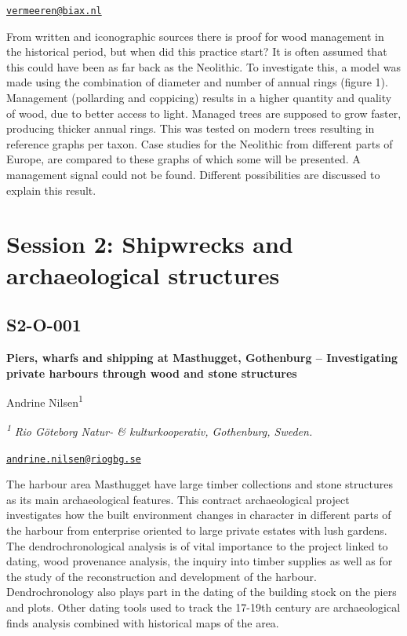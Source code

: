 \documentclass[
]{book}
\begin{document}
\href{mailto:vermeeren@biax.nl}{\nolinkurl{vermeeren@biax.nl}}

From written and iconographic sources there is proof for wood management in the historical period, but when did this practice start? It is often assumed that this could have been as far back as the Neolithic. To investigate this, a model was made using the combination of diameter and number of annual rings (figure 1). Management (pollarding and coppicing) results in a higher quantity and quality of wood, due to better access to light. Managed trees are supposed to grow faster, producing thicker annual rings. This was tested on modern trees resulting in reference graphs per taxon. Case studies for the Neolithic from different parts of Europe, are compared to these graphs of which some will be presented. A management signal could not be found. Different possibilities are discussed to explain this result.

\hypertarget{session-2-shipwrecks-and-archaeological-structures}{%
\chapter*{Session 2: Shipwrecks and archaeological structures}\label{session-2-shipwrecks-and-archaeological-structures}}

\hypertarget{s2-o-001}{%
\section*{S2-O-001}\label{s2-o-001}}

\textbf{Piers, wharfs and shipping at Masthugget, Gothenburg -- Investigating private harbours through wood and stone structures}

Andrine Nilsen\textsuperscript{1}

\textsuperscript{\emph{1}} \emph{Rio Göteborg Natur- \& kulturkooperativ, Gothenburg, Sweden.}

\href{mailto:andrine.nilsen@riogbg.se}{\nolinkurl{andrine.nilsen@riogbg.se}}

The harbour area Masthugget have large timber collections and stone structures as its main archaeological features. This contract archaeological project investigates how the built environment changes in character in different parts of the harbour from enterprise oriented to large private estates with lush gardens. The dendrochronological analysis is of vital importance to the project linked to dating, wood provenance analysis, the inquiry into timber supplies as well as for the study of the reconstruction and development of the harbour. Dendrochronology also plays part in the dating of the building stock on the piers and plots. Other dating tools used to track the 17-19th century are archaeological finds analysis combined with historical maps of the area.
\end{document}
